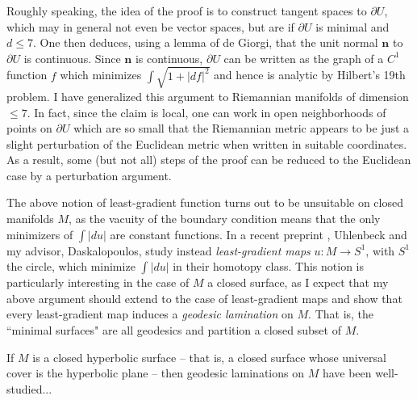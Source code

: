 \documentclass[11pt]{article}
\begin{document}
Roughly speaking, the idea of the proof is to construct tangent spaces to $\partial U$, which may in general not even be vector spaces, but are if $\partial U$ is minimal and $d \leq 7$.
One then deduces, using a lemma of de Giorgi, that the unit normal $\mathbf n$ to $\partial U$ is continuous.
Since $\mathbf n$ is continuous, $\partial U$ can be written as the graph of a $C^1$ function $f$ which minimizes $\int \sqrt{1 + |df|^2}$ and hence is analytic by Hilbert's 19th problem.
I have generalized this argument to Riemannian manifolds of dimension $\leq 7$.
In fact, since the claim is local, one can work in open neighborhoods of points on $\partial U$ which are so small that the Riemannian metric appears to be just a slight perturbation of the Euclidean metric when written in suitable coordinates.
As a result, some (but not all) steps of the proof can be reduced to the Euclidean case by a perturbation argument.

The above notion of least-gradient function turns out to be unsuitable on closed manifolds $M$, as the vacuity of the boundary condition means that the only minimizers of $\int |du|$ are constant functions.
In a recent preprint \cite{daskalopoulos2020transverse}, Uhlenbeck and my advisor, Daskalopoulos, study instead \emph{least-gradient maps} $u: M \to S^1$, with $S^1$ the circle, which minimize $\int |du|$ in their homotopy class.
This notion is particularly interesting in the case of $M$ a closed surface, as I expect that my above argument should extend to the case of least-gradient maps and show that every least-gradient map induces a \emph{geodesic lamination} on $M$.
That is, the ``minimal surfaces" are all geodesics and partition a closed subset of $M$.

If $M$ is a closed hyperbolic surface -- that is, a closed surface whose universal cover is the hyperbolic plane -- then geodesic laminations on $M$ have been well-studied...




\footnotesize
%
%
\printbibliography
\end{document}
